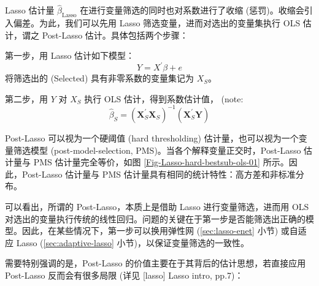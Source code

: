 Lasso 估计量 $\widehat{\beta}_{\text{Lasso}}$ 在进行变量筛选的同时也对系数进行了收缩 (惩罚)。收缩会引入偏差。为此，我们可以先用 Lasso 筛选变量，进而对选出的变量集执行 OLS 估计，谓之 Post-Lasso 估计。具体包括两个步骤：


第一步，用 Lasso 估计如下模型：
$$Y=X^{\prime} \beta+e$$
将筛选出的 (Selected) 具有非零系数的变量集记为 $X_{S}$。

第二步，用 $Y$ 对 $X_{S}$ 执行 OLS 估计，得到系数估计值， (note: %
$$\widehat{\beta}_{S}=\left(\boldsymbol{X}_{S}^{\prime} \boldsymbol{ X}_{S}\right)^{-1}\left(\boldsymbol{X}_{S}^{\prime} \boldsymbol{Y}\right)$$

Post-Lasso 可以视为一个硬阈值 (hard thresholding) 估计量，也可以视为一个变量筛选模型 (post-model-selection, PMS)。当各个解释变量正交时，Post-Lasso 估计量与 PMS 估计量完全等价，如图 \ref{Fig-Lasso-hard-bestsub-ols-01} 所示。因此，Post-Lasso 估计量与 PMS 估计量具有相同的统计特性：高方差和非标准分布。

可以看出，所谓的 Post-Lasso，本质上是借助 Lasso 进行变量筛选，进而用 OLS 对选出的变量执行传统的线性回归。问题的关键在于第一步是否能筛选出正确的模型。因此，在某些情况下，第一步可以换用弹性网 (\ref{sec:lasso-enet} 小节) 或自适应 Lasso (\ref{sec:adaptive-lasso} 小节)，以保证变量筛选的一致性。

需要特别强调的是，Post-Lasso 的价值主要在于其背后的估计思想，若直接应用 Post-Lasso 反而会有很多局限 (详见 [lasso] Lasso intro, pp.7)：

